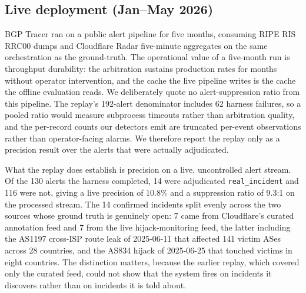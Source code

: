 \subsection{Live deployment (Jan--May 2026)}
BGP Tracer ran on a public alert pipeline for five months, consuming RIPE RIS RRC00 dumps and Cloudflare Radar five-minute aggregates on the same orchestration as the ground-truth. The operational value of a five-month run is throughput durability: the arbitration sustains production rates for months without operator intervention, and the cache the live pipeline writes is the cache the offline evaluation reads. We deliberately quote no alert-suppression ratio from this pipeline. The replay's 192-alert denominator includes 62 harness failures, so a pooled ratio would measure subprocess timeouts rather than arbitration quality, and the per-record counts our detectors emit are truncated per-event observations rather than operator-facing alarms. We therefore report the replay only as a precision result over the alerts that were actually adjudicated.

What the replay does establish is precision on a live, uncontrolled alert stream. Of the 130 alerts the harness completed, 14 were adjudicated \texttt{real\_incident} and 116 were not, giving a live precision of 10.8\% and a suppression ratio of 9.3:1 on the processed stream. The 14 confirmed incidents split evenly across the two sources whose ground truth is genuinely open: 7 came from Cloudflare's curated annotation feed and 7 from the live hijack-monitoring feed, the latter including the AS1197 cross-ISP route leak of 2025-06-11 that affected 141 victim ASes across 28 countries, and the AS834 hijack of 2025-06-25 that touched victims in eight countries. The distinction matters, because the earlier replay, which covered only the curated feed, could not show that the system fires on incidents it discovers rather than on incidents it is told about.
